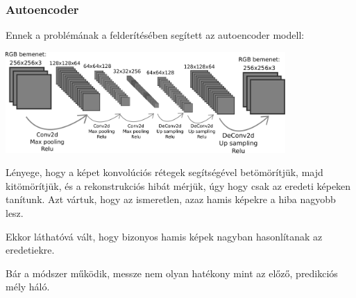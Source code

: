 \documentclass[11pt]{beamer}
\begin{document}
\begin{frame}
	\frametitle{Autoencoder}
	
	Ennek a problémának a felderítésében segített az autoencoder modell:
	
	\includegraphics[width=0.8\textwidth]{autoencoder-network-modell.pdf}

	Lényege, hogy a képet konvolúciós rétegek segítségével betömörítjük, majd kitömörítjük, és a rekonstrukciós hibát mérjük, úgy hogy csak az eredeti képeken tanítunk. Azt vártuk, hogy az ismeretlen, azaz hamis képekre a hiba nagyobb lesz.
	
	Ekkor láthatóvá vált, hogy bizonyos hamis képek nagyban hasonlítanak az eredetiekre.
	
	Bár a módszer működik, messze nem olyan hatékony mint az előző, predikciós mély háló.
	
	



\end{frame}
\end{document}
